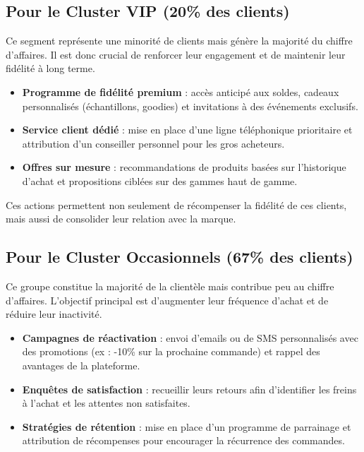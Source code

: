 \documentclass[a4paper,12pt]{article}
\begin{document}
\subsection{Pour le Cluster VIP (20\% des clients)}

Ce segment représente une minorité de clients mais génère la majorité du chiffre d'affaires. Il est donc crucial de renforcer leur engagement et de maintenir leur fidélité à long terme.

\begin{itemize}
    \item \textbf{Programme de fidélité premium} : accès anticipé aux soldes, cadeaux personnalisés (échantillons, goodies) et invitations à des événements exclusifs.
    \item \textbf{Service client dédié} : mise en place d'une ligne téléphonique prioritaire et attribution d'un conseiller personnel pour les gros acheteurs.
    \item \textbf{Offres sur mesure} : recommandations de produits basées sur l'historique d'achat et propositions ciblées sur des gammes haut de gamme.
\end{itemize}

Ces actions permettent non seulement de récompenser la fidélité de ces clients, mais aussi de consolider leur relation avec la marque.

\subsection{Pour le Cluster Occasionnels (67\% des clients)}

Ce groupe constitue la majorité de la clientèle mais contribue peu au chiffre d'affaires. L'objectif principal est d'augmenter leur fréquence d'achat et de réduire leur inactivité.

\begin{itemize}
    \item \textbf{Campagnes de réactivation} : envoi d'emails ou de SMS personnalisés avec des promotions (ex : -10\% sur la prochaine commande) et rappel des avantages de la plateforme.
    \item \textbf{Enquêtes de satisfaction} : recueillir leurs retours afin d'identifier les freins à l'achat et les attentes non satisfaites.
    \item \textbf{Stratégies de rétention} : mise en place d'un programme de parrainage et attribution de récompenses pour encourager la récurrence des commandes.
\end{itemize}
\end{document}
